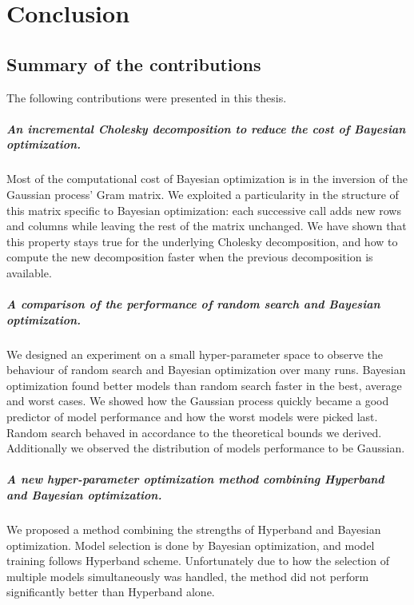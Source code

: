 \chapter{Conclusion}
\label{chap:conclusion}

\section{Summary of the contributions}

The following contributions were presented in this thesis.

\paragraph*{An incremental Cholesky decomposition to reduce the cost of Bayesian optimization.}
Most of the computational cost of Bayesian optimization is in the inversion of the Gaussian process' Gram matrix. We exploited a particularity in the structure of this matrix specific to Bayesian optimization: each successive call adds new rows and columns while leaving the rest of the matrix unchanged. We have shown that this property stays true for the underlying Cholesky decomposition, and how to compute the new decomposition faster when the previous decomposition is available.

\paragraph*{A comparison of the performance of random search and Bayesian optimization.} 
We designed an experiment on a small hyper-parameter space to observe the behaviour of random search and Bayesian optimization over many runs. Bayesian optimization found better models than random search faster in the best, average and worst cases. We showed how the Gaussian process quickly became a good predictor of model performance and how the worst models were picked last. Random search behaved in accordance to the theoretical bounds we derived. Additionally we observed the distribution of models performance to be Gaussian.

\paragraph*{A new hyper-parameter optimization method combining Hyperband and Bayesian optimization.}
We proposed a method combining the strengths of Hyperband and Bayesian optimization. Model selection is done by Bayesian optimization, and model training follows Hyperband scheme. Unfortunately due to how the selection of multiple models simultaneously was handled, the method did not perform significantly better than Hyperband alone.

